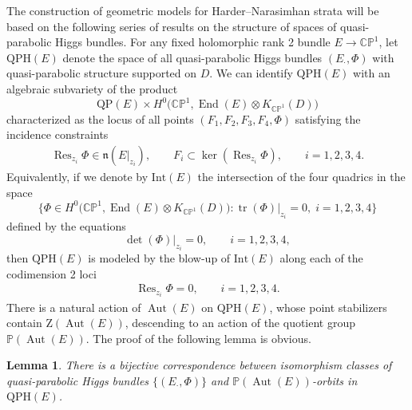 \documentclass[10pt,a4paper]{amsart}
\newcommand{\field}[1]{\ensuremath{\mathbb{#1}}}
\newcommand{\CC}{\field{C}}
\newcommand{\PP}{\field{P}}
\newcommand{\qp}{\boldsymbol{\cdot}}
\DeclareMathOperator{\Aut}{Aut}
\DeclareMathOperator{\End}{End}
\DeclareMathOperator{\Res}{Res}
\DeclareMathOperator{\tr}{tr}
\numberwithin{equation}{section}
\newtheorem{Lemma}[Theorem]{Lemma}
\begin{document}
The construction of geometric models for Harder--Narasimhan strata will be based on the following series of results on the structure of spaces of quasi-parabolic Higgs bundles. For any fixed holomorphic rank 2 bundle $E\rightarrow \CC\PP^{1}$, let $\mathrm{QPH}(E)$ denote the space of all quasi-parabolic Higgs bundles $(E_{\qp},\Phi)$ with quasi-parabolic structure supported on $D$. We can identify $\mathrm{QPH}(E)$ with an algebraic subvariety of the product
\[
\mathrm{QP}(E)\times H^{0}\bigl(\CC\PP^{1},\End(E)\otimes K_{\CC\PP^{1}}(D)\bigr)
\]
characterized as the locus of all points $(F_{1},F_{2},F_{3},F_{4},\Phi)$ satisfying the incidence constraints
\begin{gather*}%
\Res_{z_{i}}\Phi\in\mathfrak{n}(E\vert_{z_{i}}),\qquad
F_{i}\subset\ker (\Res_{z_{i}}\Phi),\qquad
i=1,2,3,4.
\end{gather*}
Equivalently, if we denote by $\mathrm{Int}(E)$ the intersection of the four quadrics in the space
\[
\bigl\{ \Phi \in H^{0}\big(\CC\PP^{1},\End(E)\otimes K_{\CC\PP^{1}}(D)\big)\colon \tr(\Phi)\vert_{z_{i}}=0,\; i=1,2,3,4\bigr\}
\]
defined by the equations
\[
\det(\Phi)\vert_{z_{i}} =0,\qquad i=1,2,3,4,
\]
then $\mathrm{QPH}(E)$ is modeled by the blow-up of $\mathrm{Int}(E)$ along each of the codimension 2 loci
\begin{gather}\label{eq:blow-up-loci}
\Res_{z_{i}}\Phi =0,\qquad i=1,2,3,4.
\end{gather}
There is a natural action of $\Aut(E)$ on $\mathrm{QPH}(E)$, whose point stabilizers contain $\mathrm{Z}(\Aut(E))$, descending to an action of the quotient group $\PP(\Aut(E))$. The proof of the following lemma is obvious.

\begin{Lemma}%
There is a bijective correspondence between isomorphism classes of quasi-parabolic Higgs bundles $\{(E_{\qp},\Phi)\}$ and $\PP(\Aut(E))$-orbits in $\mathrm{QPH}(E)$.
\end{Lemma}
\end{document}
